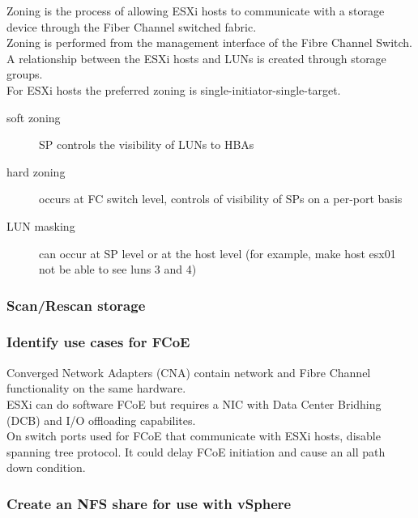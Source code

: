 Zoning is the process of allowing ESXi hosts to communicate with a storage
device through the Fiber Channel switched fabric.\\

Zoning is performed from the management interface of the Fibre Channel Switch.\\

A relationship between the ESXi hosts and LUNs is created through storage
groups.\\

For ESXi hosts the preferred zoning is single-initiator-single-target.

\begin{description}

\item[soft zoning]
SP controls the visibility of LUNs to HBAs

\item[hard zoning]
occurs at FC switch level, controls of visibility of SPs on a per-port basis

\item[LUN masking]
can occur at SP level or at the host level (for example, make host esx01 not be
able to see luns 3 and 4)

\end{description}

\subsubsection{Scan/Rescan storage}

\subsubsection{Identify use cases for FCoE}

Converged Network Adapters (CNA) contain network and Fibre Channel
functionality on the same hardware.\\

ESXi can do software FCoE but requires a NIC with Data Center Bridhing (DCB)
and I/O offloading capabilites.\\

On switch ports used for FCoE that communicate with ESXi hosts, disable
spanning tree protocol. It could delay FCoE initiation and cause an all
path down condition.

\subsubsection{Create an NFS share for use with vSphere}

